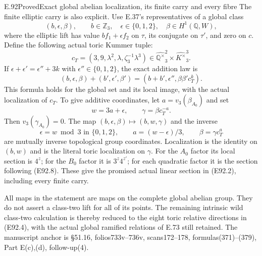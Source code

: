 \begin{statement}{E.92}{Proved}{Exact global abelian localization, its finite carry and every fibre}
The finite elliptic carry is also explicit.
Use E.37's representatives of a global class
\[
 (b,\epsilon,\beta),\qquad
 b\in\mathbb Z_3,\quad\epsilon\in\{0,1,2\},\quad
 \beta\in H^1(\mathbb Q,W),
 \tag{E92.9}
\]
where the elliptic lift has value $bf_1+\epsilon f_2$
on $\tau$, its conjugate on $\tau'$, and zero on $c$.
Define the following actual toric Kummer tuple:
\[
       c_T=(3,9,\lambda^2,\lambda,\zeta_3^{-1}\lambda^3)
                 \in\widehat{\mathbb Q^\times}_3^2
                         \times\widehat{K^\times}_3^3.
 \tag{E92.10}
\]
If $\epsilon+\epsilon'=\epsilon''+3k$ with
$\epsilon''\in\{0,1,2\}$, the exact addition law is
\[
 (b,\epsilon,\beta)+(b',\epsilon',\beta')
        =(b+b',\epsilon'',\beta\beta'c_T^k).
 \tag{E92.11}
\]
This formula holds for the global set and its
local image, with the actual localization of $c_T$.
To give additive coordinates, let
$a=v_3(\beta_{A_0})$ and set
\[
       w=3a+\epsilon,\qquad\gamma=\beta c_T^{-a}.
 \tag{E92.12}
\]
Then $v_3(\gamma_{A_0})=0$. The map
$(b,\epsilon,\beta)\mapsto(b,w,\gamma)$ and the inverse
\[
 \epsilon=w\bmod3\text{ in }\{0,1,2\},\qquad
 a=(w-\epsilon)/3,\qquad\beta=\gamma c_T^a
 \tag{E92.13}
\]
are mutually inverse topological group coordinates.
Localization is the identity on $(b,w)$ and is
the literal toric localization on $\gamma$.
For the $A_0$ factor its local section is $4^z$;
for the $B_0$ factor it is $3^z4^{z'}$; for each
quadratic factor it is the section following
(E92.8). These give the promised actual linear
section in (E92.2), including every finite carry.

All maps in the statement are maps on the complete
global abelian group. They do not assert a class-two
lift for all of its points. The remaining intrinsic
wild class-two calculation is thereby reduced to
the eight toric relative directions in (E92.4),
with the actual global ramified relations of E.73
still retained. The manuscript anchor is
\S51.16, folios733v--736v, scans172--178,
formulas(371)--(379), Part E(c),(d), follow-up(4).
\end{statement}

